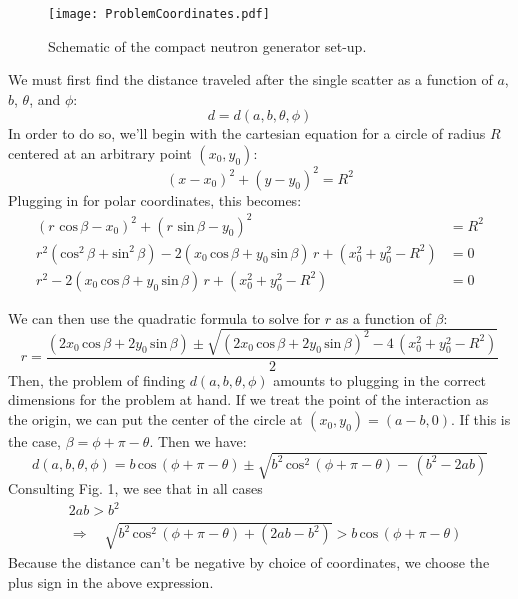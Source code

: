 \documentclass{article}
\begin{document}
\begin{figure}
\texttt{[image: ProblemCoordinates.pdf]}
\centering
\caption{Schematic of the compact neutron generator set-up.}
\end{figure}
We must first find the distance traveled after the single scatter as a function of $a$, $b$, $\theta$, and $\phi$:
\[ d = d(a,b,\theta,\phi) \]
  In order to do so, we'll begin with the cartesian equation for a circle of radius $R$ centered at an arbitrary point $(x_0,y_0)$:
  \[ (x - x_0)^2 + (y - y_0)^2 = R^2\]
 Plugging in for polar coordinates, this becomes:
 \begin{align*}
 (r \,\,\text{cos} \, \beta - x_0)^2 + (r \,\, \text{sin} \, \beta - y_0)^2 &= R^2  \\
r^2 (\text{cos}^2 \, \beta + \text{sin}^2 \, \beta) - 2( x_0 \, \text{cos} \, \beta + y_0 \, \text{sin} \, \beta) \, r + (x_0^2 + y_0^2 - R^2) &= 0 \\
r^2 - 2( x_0 \, \text{cos} \, \beta + y_0 \, \text{sin} \, \beta) \, r + (x_0^2 + y_0^2 - R^2) & = 0
\end{align*}

We can then use the quadratic formula to solve for $r$ as a function of $\beta$:
\[ r = \frac{ ( 2 x_0 \, \text{cos} \, \beta + 2 y_0 \, \text{sin} \, \beta) \pm \sqrt{ ( 2 x_0 \, \text{cos} \, \beta + 2 y_0  \,\text{sin} \, \beta)^2 - 4 \, (x_0^2 + y_0^2 - R^2)  }} {2}  \]
Then, the problem of finding $d(a,b,\theta,\phi)$ amounts to plugging in the correct dimensions for the problem at hand. If we treat the point of the interaction as the origin, we can put the center of the circle at $(x_0,y_0) = (a -b, 0)$.  If this is the case, $\beta = \phi + \pi - \theta$. Then we have:
\[ d(a,b,\theta,\phi) =  b \, \text{cos} \, (\phi + \pi - \theta) \pm \sqrt{  b^2 \, \text{cos}^2 \,(\phi + \pi - \theta)  - \, (b^2 - 2 ab)  } \]
Consulting Fig. 1, we see that in all cases 
\begin{align*}
 & 2ab > b^2 \,\,\,\,\,\,   \\
 & \Longrightarrow \,\,\,\,\,\, \sqrt{ b^2 \, \text{cos}^2 \, (\phi + \pi - \theta) + (2ab - b^2) } > b \, \text{cos} \, (\phi + \pi - \theta)
  \end{align*}
  Because the distance can't be negative by choice of coordinates, we choose the plus sign in the above expression. 
  
\end{document}

